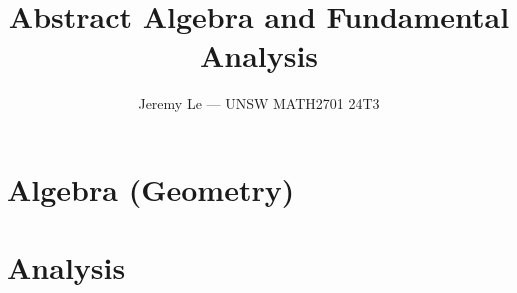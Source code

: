 \documentclass[12pt, letterpaper]{article}
\title{\textbf{Abstract Algebra and Fundamental Analysis}}
\author{Jeremy Le --- UNSW MATH2701 24T3}
\date{}
\theoremstyle{plain}
\theoremstyle{definition}
\begin{document}
\maketitle
\tableofcontents
\newpage

\section{Algebra (Geometry)}


















\section{Analysis}





\end{document}
